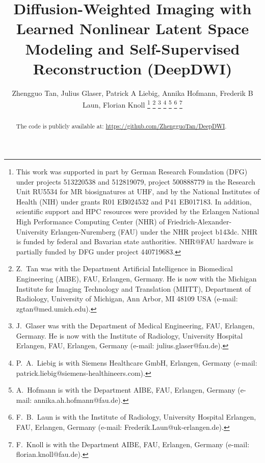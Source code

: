 \documentclass[journal,twoside,web]{ieeecolor}
\begin{document}
	\title{Diffusion-Weighted Imaging with Learned Nonlinear Latent Space Modeling and Self-Supervised Reconstruction (DeepDWI)}

	\author{Zhengguo Tan, Julius Glaser, Patrick A Liebig, Annika Hofmann, Frederik B Laun, Florian Knoll
		\thanks{This work was supported in part by
			German Research Foundation (DFG)
			under projects 513220538 and 512819079,
			project 500888779 in the Research Unit RU5534
			for MR biosignatures at UHF,
			and by the National Institutes of Health (NIH)
			under grants R01 EB024532 and P41 EB017183.
			In addition, scientific support and HPC resources
			were provided by
			the Erlangen National High Performance Computing Center (NHR)
			of Friedrich-Alexander-University Erlangen-Nuremberg (FAU)
			under the NHR project b143dc.
			NHR is funded by federal and Bavarian state authorities.
			NHR@FAU hardware is partially funded by
			DFG under project 440719683.}
		\thanks{Z.~Tan was with the Department
			Artificial Intelligence in Biomedical Engineering (AIBE),
			FAU, Erlangen, Germany.
			He is now with
			the Michigan Institute for Imaging Technology and Translation
			(MIITT),
			Department of Radiology,
			University of Michigan, Ann Arbor, MI 48109 USA
			(e-mail: zgtan@med.umich.edu).}
		\thanks{J.~Glaser was with the Department of Medical Engineering,
			FAU, Erlangen, Germany.
			He is now with the Institute of Radiology,
			University Hospital Erlangen,
			FAU, Erlangen, Germany
			(e-mail: julius.glaser@fau.de).}
		\thanks{P.~A.~Liebig is with Siemens Healthcare GmbH, Erlangen, Germany
			(e-mail: patrick.liebig@siemens-healthineers.com).}
		\thanks{A.~Hofmann is with the Department AIBE,
			FAU, Erlangen, Germany
			(e-mail: annika.ah.hofmann@fau.de).}
		\thanks{F.~B.~Laun is with the Institute of Radiology,
			University Hospital Erlangen,
			FAU, Erlangen, Germany
			(e-mail: Frederik.Laun@uk-erlangen.de).}
		\thanks{F.~Knoll is with the Department AIBE,
			FAU, Erlangen, Germany
			(e-mail: florian.knoll@fau.de).}
	}

	\maketitle

	\begin{abstract}
		The code is publicly available at: \url{https://github.com/ZhengguoTan/DeepDWI}.
	\end{abstract}
\end{document}
